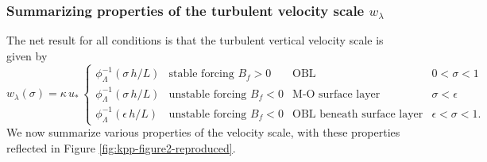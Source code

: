 \subsubsection{Summarizing properties of the turbulent velocity scale $w_{\lambda}$}

The net result for all conditions is that the turbulent vertical
velocity scale is given by
\begin{equation}
  w_{\lambda}(\sigma)  = \kappa \, u_{*} \, \left\{
 \begin{array}{llll}
   \phi^{-1}_{\Lambda}(\sigma \, h / L)   
  &\mbox{stable forcing $B_{f} > 0$} & \mbox{OBL}
  &\mbox{$0 < \sigma < 1$}
\\
  \phi^{-1}_{\Lambda}(\sigma \, h / L)   
  &\mbox{unstable forcing $B_{f} < 0$} &\mbox{M-O surface layer}
  &\mbox{$\sigma <  \epsilon$}
\\
  \phi^{-1}_{\Lambda}(\epsilon \, h / L)   
 &\mbox{unstable forcing $B_{f} < 0$} &\mbox{OBL beneath surface layer}
 &\mbox{$\epsilon < \sigma < 1$.}
\end{array} 
 \right.
\label{eq:wlambda-general}
\end{equation}
We now summarize various properties of the velocity scale, with these
properties reflected in Figure \ref{fig:kpp-figure2-reproduced}.
